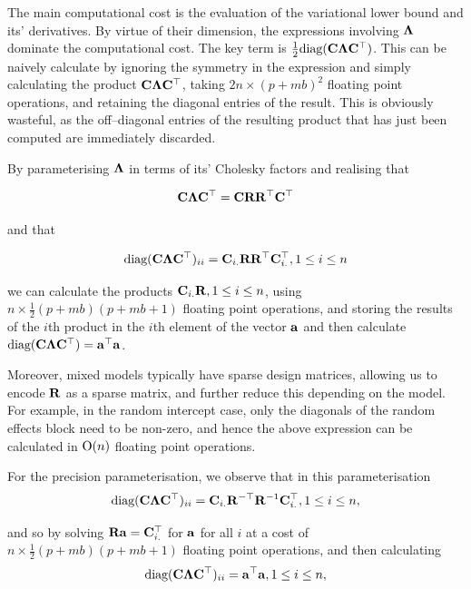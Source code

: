 \documentclass{amsart}[12pt]
\begin{document}
			The main computational cost is the evaluation of the variational lower bound and its' derivatives. By
			virtue of their dimension, the expressions involving ${\boldsymbol \Lambda}$ dominate the computational cost. The key
			term is $\frac{1}{2} \text{diag}({\bf C} {\boldsymbol \Lambda} {\bf C}^\top)$. This can be naively calculate by ignoring the
			symmetry in the expression and simply calculating the product ${\bf C} {\boldsymbol \Lambda} {\bf C}^\top$, taking $2 n
			\times (p + m b)^2$ floating point operations, and retaining the diagonal entries of the result. This is
			obviously wasteful, as the off--diagonal entries of the resulting product that has just been computed
			are immediately discarded.
				
			By parameterising ${\boldsymbol \Lambda}$ in terms of its' Cholesky factors and realising that
				
			\[
				{\bf C} {\boldsymbol \Lambda} {\bf C}^\top = {\bf C} {\bf R} {\bf R}^\top {\bf C}^\top
			\]
				
			\noindent and that
				
			\[
				\text{diag}({\bf C} {\boldsymbol \Lambda} {\bf C}^\top)_{ii} = {\bf C}_{i .} {\bf R} {\bf R}^\top {\bf C}_{i .}^\top, 1 \leq i \leq n
			\]
				
			\noindent we can calculate the products ${\bf C}_{i .} {\bf R}, 1 \leq i \leq n$, using $n \times \frac{1}{2}(p + m
			b)(p + m b   + 1)$ floating point operations, and storing the results of the $i$th product in the $i$th
			element of the   vector ${\bf a}$ and then calculate $\text{diag}({\bf C} {\boldsymbol \Lambda} {\bf C}^\top) = {\bf a}^\top {\bf a}$.
				
			Moreover, mixed models typically have sparse design matrices, allowing us to encode ${\bf R}$ as a sparse matrix, and	further reduce   this depending on the model. For example, in the random intercept case, only the diagonals of the random effects block need to be non-zero, and hence the above expression can be calculated in
			$\text{O}(n)$ floating point operations.
				
				
			For the precision parameterisation, we observe that in this parameterisation
			\[
				\text{diag}({\bf C} {\boldsymbol \Lambda} {\bf C}^\top)_{ii} = {\bf C}_{i .} {\bf R}^{-\top} {\bf R}^{-1} {\bf C}_{i .}^\top, 1 \leq i \leq n,
			\]
				
			\noindent and so by solving ${\bf R} {\bf a} = {\bf C}_{i .}^\top$ for ${\bf a}$ for all $i$ at a cost of $n \times
			\frac{1}{2} (p + m b) (p + m b + 1)$ floating point operations, and then calculating
			\[
				\text{diag}({\bf C} {\boldsymbol \Lambda} {\bf C}^\top)_{ii} = {\bf a}^\top {\bf a}, 1 \leq i \leq n,
			\]
				
\end{document}
